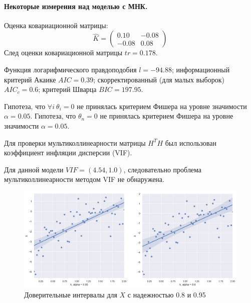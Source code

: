 \documentclass[a4paper,12pt]{article}
\begin{document}
\paragraph{Некоторые измерения над моделью с МНК.\\}
Оценка ковариационной матрицы:
$$ \hat{K} = 
\begin{pmatrix}
    0.10 & -0.08\\
    -0.08 & 0.08
\end{pmatrix}
$$
След оценки ковариационной матрицы $tr = 0.178$.

Функция логарифмического правдоподобия $l = -94.88$; информационный критерий Акаике $AIC = 0.39$; скорректированный (для малых выборок) $AIC_c = 0.6$; критерий Шварца $BIC = 197.95$.

Гипотеза, что $\forall i~\theta_i=0$ не принялась критерием Фишера на уровне значимости $\alpha = 0.05$.
Гипотеза, что $\theta_n = 0$ не принялась критерием Фишера на уровне значимости $\alpha = 0.05$.

Для проверки мультиколлинеарности матрицы $H^T H$ был использован коэффициент инфляции дисперсии (VIF).

Для данной модели $VIF = (4.54, 1.0)$, следовательно проблема мультиколлинеарности методом VIF не обнаружена.

\begin{figure}[H]
    \includegraphics[width=\linewidth]{src/img/доврительные_интервалы.png}
    \caption{Доверительные интервалы для $X$ с надежностью 0.8 и 0.95}
\end{figure}
\end{document}
